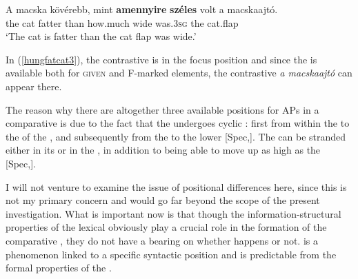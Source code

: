 \ea \gll A macska kövérebb, mint	\textbf{amennyire}	\textbf{széles}	volt a macskaajtó. \label{hungfatcat3}\\
the	cat	fatter	than	how.much	wide	was.\textsc{3sg}	the	cat.flap\\
\glt `The cat is fatter than the cat flap was wide.'
\z
	
In (\ref{hungfatcat3}), the contrastive  is in the focus position and since the  is available both for \textsc{given} and F-marked elements, the contrastive  \textit{a macskaajtó} can appear there.

The reason why there are altogether three available positions for APs in a  comparative  is due to the fact that the  undergoes cyclic : first from within the  to the  of the , and subsequently from the  to the lower [Spec,]. The  can be stranded either in its  or in the , in addition to being able to move up as high as the [Spec,].

I will not venture to examine the issue of positional differences here, since this is not my primary concern and would go far beyond the scope of the present investigation. What is important now is that though the information-structural properties of the lexical  obviously play a crucial role in the formation of the comparative , they do not have a bearing on whether  happens or not.  is a phenomenon linked to a specific syntactic position and is predictable from the formal properties of the .
